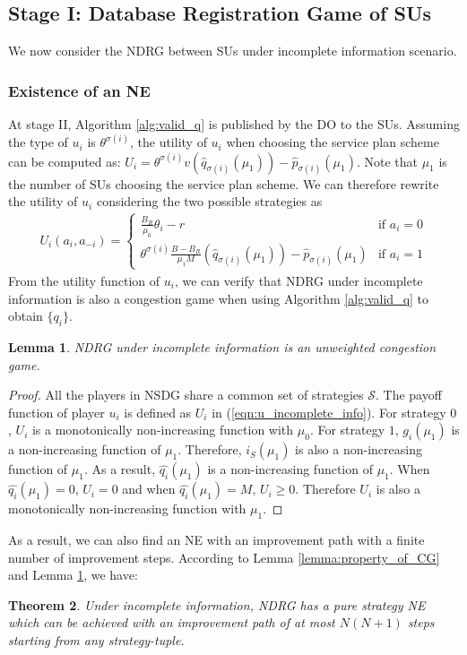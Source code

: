\documentclass[journal]{IEEEtran}
\newtheorem{theorem}{Theorem}
\newtheorem{lemma}[theorem]{Lemma}
\begin{document}
\subsection{Stage I: Database Registration Game of SUs}

We now consider the NDRG between SUs under incomplete information scenario.

\subsubsection{Existence of an NE}

At stage II, Algorithm \ref{alg:valid_q} is published by the DO to the SUs. Assuming the type of $u_i$ is $\theta^{\sigma(i)}$, the utility of $u_i$ when choosing the service plan scheme can be computed as:
$
U_i=\theta^{\sigma(i)}v(\hat{q}_{\sigma(i)}(\mu_1))-\hat{p}_{\sigma(i)}(\mu_1)
$.
Note that $\mu_1$ is the number of SUs choosing the service plan scheme. We can therefore rewrite the utility of $u_i$ considering the two possible strategies as
\begin{eqnarray}
\label{eqn:u_imcomplete_info}
U_i(a_i, a_{-i})=\left\{
\begin{array}{ll}
\frac{B_R}{\mu_0}\theta_i-r & \textrm{if $a_i=0$} \\
\theta^{\sigma(i)}\frac{B-B_R}{\mu_1M}(\hat{q}_{\sigma(i)}(\mu_1))-\hat{p}_{\sigma(i)}(\mu_1) & \textrm{if $a_i=1$}
\end{array}
\right. \label{eqn:u_incomplete_info}
\end{eqnarray}
From the utility function of $u_i$, we can verify that NDRG under incomplete information is also a congestion game when using Algorithm \ref{alg:valid_q} to obtain $\{q_i\}$.
\begin{lemma}
\label{lemma:NDRG_is_CG2}
NDRG under incomplete information is an unweighted congestion game.
\end{lemma}
\begin{proof}
All the players in NSDG share a common set of strategies $\mathcal{S}$. The payoff function of player $u_i$ is defined as $U_i$ in (\ref{eqn:u_incomplete_info}). For strategy $0$, $U_i$ is a monotonically non-increasing function with $\mu_0$. For strategy $1$, $g_i(\mu_1)$ is a non-increasing function of $\mu_1$. Therefore, $i_S(\mu_1)$ is also a non-increasing function of $\mu_1$. As a result, $\hat{q_i}(\mu_1)$ is a non-increasing function of $\mu_1$.
When $\hat{q_i}(\mu_1)=0$, $U_i=0$ and when $\hat{q_i}(\mu_1)=M$, $U_i\geq0$. Therefore $U_i$ is also a monotonically non-increasing function with $\mu_1$.
\end{proof}
As a result, we can also find an NE with an improvement path with a finite number of improvement steps. According to Lemma \ref{lemma:property_of_CG} and Lemma \ref{lemma:NDRG_is_CG2}, we have:
\begin{theorem}
\label{thm:NDRG_property2}
Under incomplete information, NDRG has a pure strategy NE which can be achieved with an improvement path of at most $N(N+1)$ steps starting from any strategy-tuple.
\end{theorem}
\end{document}
